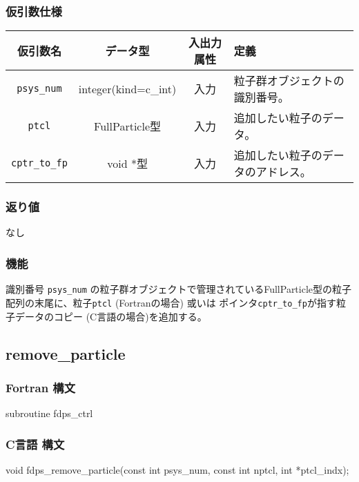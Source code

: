 \subsubsection*{仮引数仕様}
\begin{table}[h]
\begin{tabularx}{\linewidth}{cccX}
\toprule
\rowcolor{Snow2}
仮引数名 & データ型 & 入出力属性 & 定義 \\
\midrule
\texttt{psys\_num} & integer(kind=c\_int) & 入力 & 粒子群オブジェクトの識別番号。\\
\texttt{ptcl} & FullParticle型 & 入力 & 追加したい粒子のデータ。\\
\texttt{cptr\_to\_fp} & void *型 & 入力 & 追加したい粒子のデータのアドレス。\\
\bottomrule
\end{tabularx}
\end{table}


\subsubsection*{返り値}
なし

\subsubsection*{機能}
識別番号 \texttt{psys\_num} の粒子群オブジェクトで管理されているFullParticle型の粒子配列の末尾に、粒子\texttt{ptcl} {\small (Fortranの場合)} 或いは ポインタ\texttt{cptr\_to\_fp}が指す粒子データのコピー {\small (C言語の場合)}を追加する。

\clearpage


\subsection{remove\_particle}
\subsubsection*{Fortran 構文}
\begin{screen}
\begin{spverbatim}
subroutine fdps_ctrl%
\end{spverbatim}
\end{screen}

\subsubsection*{C言語 構文}
\begin{screen}
\begin{spverbatim}
void fdps_remove_particle(const int psys_num,                                                       
                          const int nptcl,
                          int *ptcl_indx);
\end{spverbatim}
\end{screen}


